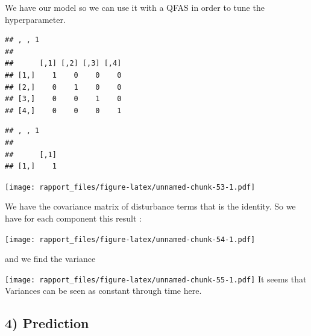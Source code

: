 \documentclass[]{article}
\newenvironment{Shaded}{\begin{snugshade}}{\end{snugshade}}
\newcommand{\KeywordTok}[1]{\textcolor[rgb]{0.13,0.29,0.53}{\textbf{#1}}}
\newcommand{\DataTypeTok}[1]{\textcolor[rgb]{0.13,0.29,0.53}{#1}}
\newcommand{\DecValTok}[1]{\textcolor[rgb]{0.00,0.00,0.81}{#1}}
\newcommand{\StringTok}[1]{\textcolor[rgb]{0.31,0.60,0.02}{#1}}
\newcommand{\CommentTok}[1]{\textcolor[rgb]{0.56,0.35,0.01}{\textit{#1}}}
\newcommand{\OtherTok}[1]{\textcolor[rgb]{0.56,0.35,0.01}{#1}}
\newcommand{\OperatorTok}[1]{\textcolor[rgb]{0.81,0.36,0.00}{\textbf{#1}}}
\newcommand{\NormalTok}[1]{#1}
\begin{document}
We have our model so we can use it with a QFAS in order to tune the
hyperparameter.

\begin{verbatim}
## , , 1
## 
##      [,1] [,2] [,3] [,4]
## [1,]    1    0    0    0
## [2,]    0    1    0    0
## [3,]    0    0    1    0
## [4,]    0    0    0    1
\end{verbatim}

\begin{verbatim}
## , , 1
## 
##      [,1]
## [1,]    1
\end{verbatim}

\texttt{[image: rapport\_files/figure-latex/unnamed-chunk-53-1.pdf]}

We have the covariance matrix of disturbance terms that is the identity.
So we have for each component this result :

\begin{Shaded}
\end{Shaded}

\texttt{[image: rapport\_files/figure-latex/unnamed-chunk-54-1.pdf]}

and we find the variance

\begin{Shaded}
\end{Shaded}

\texttt{[image: rapport\_files/figure-latex/unnamed-chunk-55-1.pdf]} It
seems that Variances can be seen as constant through time here.

\subsection{4) Prediction}
\end{document}

